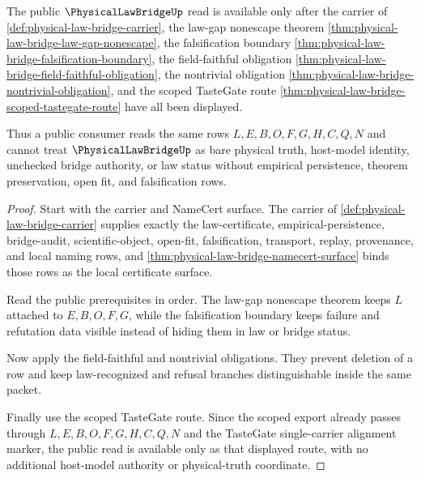 \begin{theorem}
\label{thm:physicallawbridge-public-closure-route}
The public $\PhysicalLawBridgeUp$ read is available only after the carrier of \autoref{def:physical-law-bridge-carrier}, the law-gap nonescape theorem \autoref{thm:physical-law-bridge-law-gap-nonescape}, the falsification boundary \autoref{thm:physical-law-bridge-falsification-boundary}, the field-faithful obligation \autoref{thm:physical-law-bridge-field-faithful-obligation}, the nontrivial obligation \autoref{thm:physical-law-bridge-nontrivial-obligation}, and the scoped TasteGate route \autoref{thm:physical-law-bridge-scoped-tastegate-route} have all been displayed.

Thus a public consumer reads the same rows $L,E,B,O,F,G,H,C,Q,N$ and cannot treat $\PhysicalLawBridgeUp$ as bare physical truth, host-model identity, unchecked bridge authority, or law status without empirical persistence, theorem preservation, open fit, and falsification rows.
\end{theorem}
\begin{proof}
Start with the carrier and NameCert surface. The carrier of \autoref{def:physical-law-bridge-carrier} supplies exactly the law-certificate, empirical-persistence, bridge-audit, scientific-object, open-fit, falsification, transport, replay, provenance, and local naming rows, and \autoref{thm:physical-law-bridge-namecert-surface} binds those rows as the local certificate surface.

Read the public prerequisites in order. The law-gap nonescape theorem keeps $L$ attached to $E,B,O,F,G$, while the falsification boundary keeps failure and refutation data visible instead of hiding them in law or bridge status.

Now apply the field-faithful and nontrivial obligations. They prevent deletion of a row and keep law-recognized and refusal branches distinguishable inside the same packet.

Finally use the scoped TasteGate route. Since the scoped export already passes through $L,E,B,O,F,G,H,C,Q,N$ and the TasteGate single-carrier alignment marker, the public read is available only as that displayed route, with no additional host-model authority or physical-truth coordinate.
\end{proof}


